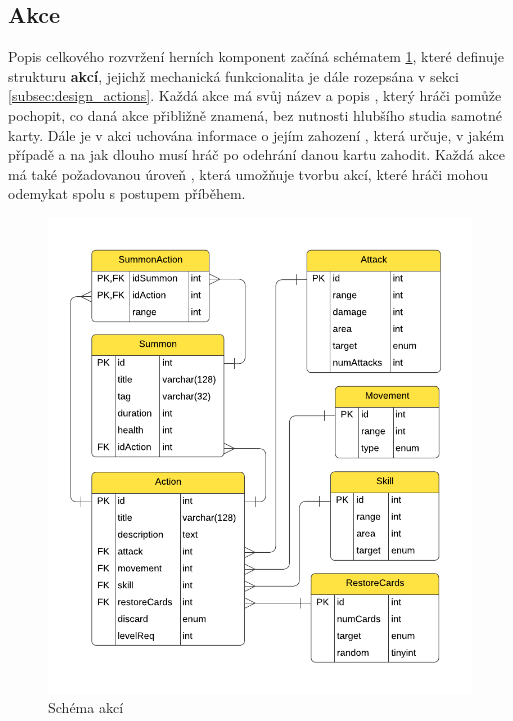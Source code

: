 \subsection{Akce}
\label{subsec:schema_actions}

Popis celkového rozvržení herních komponent začíná schématem \ref{diag:er_action}, které definuje strukturu \textbf{akcí}, jejichž mechanická funkcionalita je dále rozepsána v sekci \ref{subsec:design_actions}. Každá akce má svůj název  a popis , který hráči pomůže pochopit, co daná akce přibližně znamená, bez nutnosti hlubšího studia samotné karty. Dále je v akci uchována informace o jejím zahození , která určuje, v jakém případě a na jak dlouho musí hráč po odehrání danou kartu zahodit. Každá akce má také požadovanou úroveň , která umožňuje tvorbu akcí, které hráči mohou odemykat spolu s postupem příběhem.

\begin{figure}[h]
    \centering
    \includegraphics[scale=0.8]{../../shared/diagrams/er_action.pdf}
    \caption{Schéma akcí}
    \label{diag:er_action}
\end{figure}

